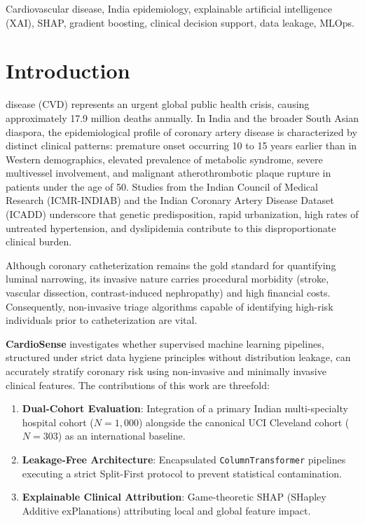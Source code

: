 \documentclass[journal]{IEEEtran}
\begin{document}
\begin{IEEEkeywords}
Cardiovascular disease, India epidemiology, explainable artificial intelligence (XAI), SHAP, gradient boosting, clinical decision support, data leakage, MLOps.
\end{IEEEkeywords}

\section{Introduction}
 disease (CVD) represents an urgent global public health crisis, causing approximately 17.9 million deaths annually. In India and the broader South Asian diaspora, the epidemiological profile of coronary artery disease is characterized by distinct clinical patterns: premature onset occurring 10 to 15 years earlier than in Western demographics, elevated prevalence of metabolic syndrome, severe multivessel involvement, and malignant atherothrombotic plaque rupture in patients under the age of 50. Studies from the Indian Council of Medical Research (ICMR-INDIAB) and the Indian Coronary Artery Disease Dataset (ICADD) underscore that genetic predisposition, rapid urbanization, high rates of untreated hypertension, and dyslipidemia contribute to this disproportionate clinical burden.

Although coronary catheterization remains the gold standard for quantifying luminal narrowing, its invasive nature carries procedural morbidity (stroke, vascular dissection, contrast-induced nephropathy) and high financial costs. Consequently, non-invasive triage algorithms capable of identifying high-risk individuals prior to catheterization are vital.

\textbf{CardioSense} investigates whether supervised machine learning pipelines, structured under strict data hygiene principles without distribution leakage, can accurately stratify coronary risk using non-invasive and minimally invasive clinical features. The contributions of this work are threefold:
\begin{enumerate}
    \item \textbf{Dual-Cohort Evaluation}: Integration of a primary Indian multi-specialty hospital cohort ($N=1,000$) alongside the canonical UCI Cleveland cohort ($N=303$) as an international baseline.
    \item \textbf{Leakage-Free Architecture}: Encapsulated \texttt{ColumnTransformer} pipelines executing a strict Split-First protocol to prevent statistical contamination.
    \item \textbf{Explainable Clinical Attribution}: Game-theoretic SHAP (SHapley Additive exPlanations) attributing local and global feature impact.
\end{enumerate}
\end{document}
